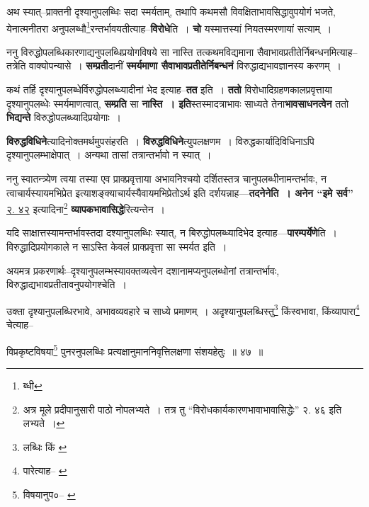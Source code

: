 \documentclass[article,12pt,a4paper]{memoir}
\begin{document}
	  \pstart अथ स्यात्--प्राक्तनी दृश्यानुपलब्धिः सदा स्मर्यताम्, तथापि कथमसौ विवक्षिताभावसिद्धावुपयोगं भजते, येनात्मनीतरा अनुपलब्धौ\footnote{ब्धी}रन्तर्भावयतीत्याह--\textbf{विरोधे}ति । \textbf{चो} यस्मात्तस्यां नियतस्मरणायां सत्याम् ।
	\pend
      

	  \pstart ननु विरुद्धोपलब्धिकारणाद्यनुपलब्धिप्रयोगविषये सा नास्ति तत्कथमविद्यमाना सैवाभावप्रतीतेर्निबन्धनमित्याह--तत्रेति वाक्योपन्यासे । \textbf{सम्प्रती}दानीं \textbf{स्मर्यमाणा सैवाभावप्रतीतेर्निबन्धनं} विरुद्धाद्यभावज्ञानस्य करणम् ।
	\pend
      

	  \pstart कथं तर्हि दृश्यानुपलब्धेर्विरुद्धोपलब्ध्यादीनां भेद इत्याह--\textbf{तत} इति । \textbf{ततो} विरोधादिग्रहणकालप्रवृत्ताया दृश्यानुपलब्धेः स्मर्यमाणत्वात्, \textbf{सम्प्रति} सा \textbf{नास्ति । इति}स्तस्मादत्राभावः साध्यते तेना\textbf{भावसाधनत्वेन} ततो \textbf{भिद्यन्ते} विरुद्धोपलब्ध्यादिप्रयोगाः ।
	\pend
      

	  \pstart \textbf{विरुद्धविधिने}त्यादिनोक्तमर्थमुपसंहरति । \textbf{विरुद्धविधिने}त्युपलक्षणम । विरुद्धकार्यादिविधिनाऽपि दृश्यानुपलम्भाक्षेपात् । अन्यथा तासां तत्रान्तर्भावो न स्यात् ।
	\pend
      

	  \pstart ननु स्वातन्त्र्येण त्वया तस्या एव प्राक्प्रवृत्ताया अभावनिश्चयो दर्शितस्तत्र चानुपलब्धीनामन्तर्भावः, न त्वाचार्यस्यायमभिप्रेत इत्याशङ्क्याचार्यस्यैवायमभिप्रेतोऽर्थ इति दर्शयन्नाह—\textbf{तदनेनेति । अनेन “इमे सर्व”} \href{http://http://sarit.indology.info/?cref=2.42}{२. ४२} इत्यादिना\footnote{अत्र मूले प्रदीपानुसारी पाठो नोपलभ्यते । तत्र तु “विरोधकार्यकारणभावाभावासिद्धेः” २. ४६ इति लभ्यते ।} \textbf{व्यापकभावासिद्धे}रित्यन्तेन ।
	\pend
      

	  \pstart यदि साक्षात्तस्यामन्तर्भावस्तदा दश्यानुपलब्धिः स्यात्, न बिरुद्धोपलब्ध्यादिभेद इत्याह—\textbf{पारम्पर्येणे}ति । विरुद्धादिप्रयोगकाले न साऽस्ति केवलं प्राक्प्रवृत्ता सा स्मर्यत इति ।
	\pend
      

	  \pstart अयमत्र प्रकरणार्थः--दृश्यानुपलम्भस्यावक्तव्यत्वेन दशानामप्यनुपलब्धोनां तत्रान्तर्भावः, विरुद्धाद्यभावप्रतीतावनुपयोगश्चेति ।
	\pend
      \leavevmode{}
	  \bigskip
	  \begingroup
	

	  \pstart उक्ता दृश्यानुपलब्धिरभावे, अभावव्यवहारे च साध्ये प्रमाणम् । अदृश्यानुपलब्धिस्तु\footnote{लब्धिः किं \cite{dp-msA} \cite{dp-edP} \cite{dp-edH} \cite{dp-edE}} किंस्वभावा, किंव्यापारा\footnote{पारेत्याह--\cite{dp-msB} \cite{dp-msD}} चेत्याह--
	\pend
       
	  \bigskip
	  \begingroup
	

	  \pstart विप्रकृष्टविषया\footnote{विषयानुप०--\cite{dp-msB} \cite{dp-msC} \cite{dp-edH} \cite{dp-edE} \cite{dp-edN}} पुनरनुपलब्धिः प्रत्यक्षानुमाननिवृत्तिलक्षणा संशयहेतुः ॥ ४७ ॥
	\pend
      
\end{document}
